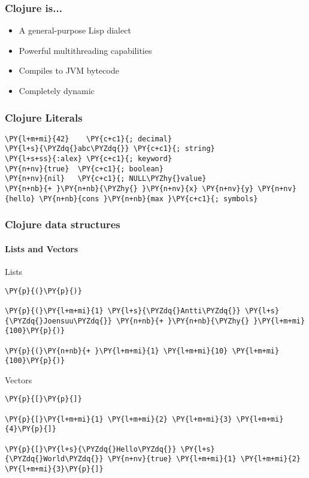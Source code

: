 \begin{frame}
  \frametitle{Clojure is...}


  \begin{itemize}[<+->]
    \item<1-> A general-purpose Lisp dialect
    \item<2-> Powerful multithreading capabilities
    \item<3-> Compiles to JVM bytecode
    \item<4-> Completely dynamic
  \end{itemize}
\end{frame}


\begin{frame}[fragile]
  \frametitle{Clojure Literals}
\begin{Verbatim}[commandchars=\\\{\}]
\PY{l+m+mi}{42}    \PY{c+c1}{; decimal}
\PY{l+s}{\PYZdq{}abc\PYZdq{}} \PY{c+c1}{; string}
\PY{l+s+ss}{:alex} \PY{c+c1}{; keyword}
\PY{n+nv}{true}  \PY{c+c1}{; boolean}
\PY{n+nv}{nil}   \PY{c+c1}{; NULL\PYZhy{}value}
\PY{n+nb}{+ }\PY{n+nb}{\PYZhy{} }\PY{n+nv}{x} \PY{n+nv}{y} \PY{n+nv}{hello} \PY{n+nb}{cons }\PY{n+nb}{max }\PY{c+c1}{; symbols}
\end{Verbatim}
\end{frame}


\begin{frame}[fragile]
  \frametitle{Clojure data structures}
  \framesubtitle{Lists and Vectors}

  \begin{block}{Lists}
\begin{Verbatim}[commandchars=\\\{\}]
\PY{p}{(}\PY{p}{)}

\PY{p}{(}\PY{l+m+mi}{1} \PY{l+s}{\PYZdq{}Antti\PYZdq{}} \PY{l+s}{\PYZdq{}Joensuu\PYZdq{}} \PY{n+nb}{+ }\PY{n+nb}{\PYZhy{} }\PY{l+m+mi}{100}\PY{p}{)}

\PY{p}{(}\PY{n+nb}{+ }\PY{l+m+mi}{1} \PY{l+m+mi}{10} \PY{l+m+mi}{100}\PY{p}{)}
\end{Verbatim}
  \end{block}

  \begin{block}{Vectors}
\begin{Verbatim}[commandchars=\\\{\}]
\PY{p}{[}\PY{p}{]}

\PY{p}{[}\PY{l+m+mi}{1} \PY{l+m+mi}{2} \PY{l+m+mi}{3} \PY{l+m+mi}{4}\PY{p}{]}

\PY{p}{[}\PY{l+s}{\PYZdq{}Hello\PYZdq{}} \PY{l+s}{\PYZdq{}World\PYZdq{}} \PY{n+nv}{true} \PY{l+m+mi}{1} \PY{l+m+mi}{2} \PY{l+m+mi}{3}\PY{p}{]}
\end{Verbatim}
  \end{block}
\end{frame}


